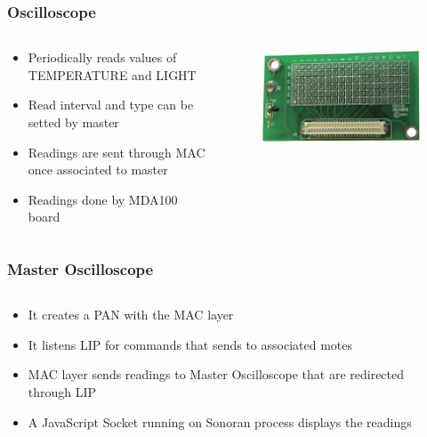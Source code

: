 \begin{frame}[fragile]
 \frametitle{Oscilloscope}
 \begin{columns}
    \begin{column}{.58\linewidth}
      \begin{itemize}
      	\item Periodically reads values of TEMPERATURE and LIGHT
      	\item Read interval and type can be setted by master
      	\item Readings are sent through MAC once associated to master
      	\item Readings done by MDA100 board
      \end{itemize}
    \end{column}
    \hfill
    \begin{column}{.4\linewidth}
      \begin{figure}
	\includegraphics[width=\textwidth]{img/mda100.jpg}
      \end{figure}
    \end{column}
  \end{columns}
\end{frame}

\begin{frame}[fragile]
 \frametitle{Master Oscilloscope}
 \begin{columns}
    \begin{column}{.58\linewidth}
      \begin{itemize}
	\item It creates a PAN with the MAC layer
	\item It listens LIP for commands that sends to associated motes
	\item MAC layer sends readings to Master Oscilloscope that are redirected through LIP 
	\item A JavaScript Socket running on Sonoran process displays the readings
      \end{itemize}
  \end{column}
  \hfill
    \begin{column}{.4\linewidth}
    \end{column}
  \end{columns}
\end{frame}
